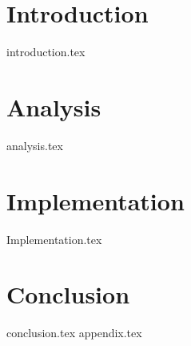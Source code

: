 \documentclass[
    nolot,
    color,   %
	table,   %
    twoside, %
]{fithesis/fithesis3}
\begin{document}
  \pagestyle{plain}
  
  \chapter{Introduction}
  {introduction.tex}
  \chapter{Analysis}
  {analysis.tex}
  \chapter{Implementation}
  {Implementation.tex}
  
  \chapter{Conclusion}
  {conclusion.tex}
  {}
  {appendix.tex}
\end{document}
